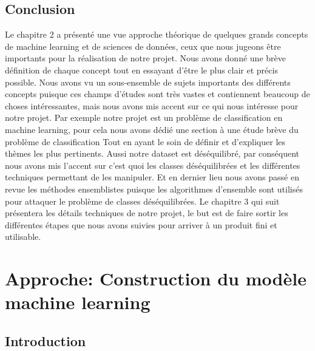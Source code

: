 \documentclass[12pt, french]{report}
\begin{document}
\section{Conclusion}
Le chapitre 2 a présenté une vue approche théorique de quelques grands concepts de machine learning et de sciences de données, ceux que nous jugeons être importants pour la réalisation de notre projet. Nous avons donné une brève définition de chaque concept tout en essayant d'être le plus clair et précis possible. Nous avons vu un sous-ensemble de sujets importants des différents concepts puisque ces champs d'études sont très vastes et contiennent beaucoup de choses intéressantes, mais nous avons mis accent sur ce qui nous intéresse pour notre projet. Par exemple notre projet est un problème de classification en machine learning, pour cela nous avons dédié une section à une étude brève du problème de classification Tout en ayant le soin de définir et d'expliquer les thèmes les plus pertinents. Aussi notre dataset est déséquilibré, par conséquent nous avons mis l'accent sur c'est quoi les classes déséquilibrées et les différentes techniques permettant de les manipuler. Et en dernier lieu nous avons passé en revue les méthodes ensemblistes puisque les algorithmes d'ensemble sont utilisés pour attaquer le problème de classes déséquilibrées. Le chapitre 3 qui suit présentera les détails techniques de notre projet, le but est de faire sortir les différentes étapes que nous avons suivies pour arriver à un produit fini et utilisable.

 




%
%
%
%
%



\newpage

\chapter{Approche: Construction du modèle machine learning}
\section{Introduction}
\end{document}
